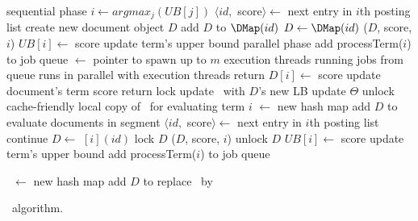 
\begin{algorithm*}[htb]
\begin{multicols}{2}
\begin{algorithmic}[1]

\Repeat \Comment sequential phase \label{l:seq-start}
	\State $i \leftarrow argmax_{j}(UB[j])$ 
	\State $\langle id,$ score$\rangle \leftarrow$ next entry 
    	in $i$th posting list
    	\State create new document object $D$
        \State add $D$ to $\DMap(id)$
	\Else 
    	\State $D \leftarrow \DMap(id)$
	\EndIf
	($D$, score, $i$)
    \State $UB[i] \leftarrow$ score 
    	\Comment update term's upper bound \label{l:seq-update-ub}
 \label{l:seq-end}
\Statex 
{} \Comment parallel phase \label{l:par-begin}
\State add {\sc processTerm($i$)} to job queue \label{l:par-init-job}
\State \TMap[i] $\leftarrow$ pointer to \DMap
\EndFor
\State spawn up to $m$ execution threads running jobs from queue\label{l:start-threads}
 \Comment runs in parallel with execution threads
\State return \DHeap \label{l:par-end}
%
\Statex 
{} 
   	\State $D[i] \leftarrow$ score \Comment update document's term score
        \State return %
    \EndIf
{} lock \DHeap \EndIf \label{l:lock-heap}
\State update \DHeap\ with $D$'s new LB %
\State update $\Theta$
 unlock \DHeap \EndIf \label{l:unlock-heap}
\EndProcedure
%
\Statex 
{} 
	\If{$|\DMap | < \Phi$ $\wedge$ \TMap[i]=\DMap} \label{l:hash-start}
    \State \Comment cache-friendly local copy of \DMap\ for evaluating term $i$
        	\State \TMap[i] $\leftarrow$ new hash map
            	\State add $D$ to \TMap[i] \label{l:hash-chash}
            \EndFor
    \EndIf \label{l:hash-end}
    \Statex
	 \Comment evaluate documents in segment
    	\State $\langle id,$ score$\rangle \leftarrow$ next entry 
    	in $i$th posting list
        	\State continue 
        \Else 
        	\State $D \leftarrow$ \TMap$[i](id)$
        \EndIf
        \State lock $D$
		($D$, score, $i$)
        \State unlock $D$ 
	\EndFor %
	\State $UB[i] \leftarrow$ score \Comment update term's upper bound \label{l:thread-update-ub}    
	\State add {\sc processTerm($i$)} to job queue \label{l:new-task}
\EndProcedure

%
\Statex 
{} \label{l:clean-start}
\State \LDMap\ $\leftarrow$ new hash map \label{l:clean-local-copy}
{} 
	\State add   $D$ to \LDMap
\EndIf
\EndFor
\State replace \DMap\ by \LDMap \label{l:clean-replace}
\label{l:clean-end}
\EndWhile
\EndProcedure 
\end{algorithmic}
\end{multicols}
\caption{\alg\ algorithm.}
\label{alg:sparta}
\end{algorithm*}